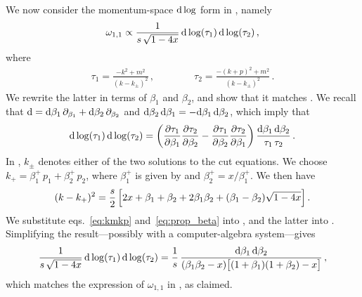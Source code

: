 We now consider the momentum-space $\mathrm{d} \log$ form in , namely
\begin{align} \label{eq:omega11mom}
\omega_{1,1} \propto \frac{1}{s \, \sqrt{1-4x }} \, \mathrm{d} \log(\tau_1) \, \mathrm{d} \log(\tau_2) \,,
\end{align}
where
\begin{align} \label{eq:taus}
\tau_1 = \frac{-k^2+m^2}{(k-k_{\pm})^2} \,, \qquad \qquad \tau_2 = \frac{-(k+p)^2+m^2}{(k-k_{\pm})^2} \,.
\end{align}
We rewrite the latter in terms of $\beta_1$ and $\beta_2$, and show that it matches .
We recall that $\mathrm{d} = \mathrm{d}\beta_1 \, \partial_{\beta_1} + \mathrm{d}\beta_2 \, \partial_{\beta_2}$ and $\mathrm{d} \beta_2 \, \mathrm{d} \beta_1 = - \mathrm{d} \beta_1 \, \mathrm{d} \beta_2$, which imply that
\begin{align} \label{eq:dk2dbeta}
\mathrm{d} \log(\tau_1) \, \mathrm{d} \log(\tau_2) = \left( \frac{\partial \tau_1}{\partial \beta_1} \frac{\partial \tau_2}{\partial \beta_2} - 
   \frac{\partial \tau_1}{\partial \beta_2} \frac{\partial \tau_2}{\partial \beta_1} \right) \frac{\mathrm{d} \beta_1 \, \mathrm{d} \beta_2}{\tau_1 \, \tau_2} \,.
\end{align}
In , $k_{\pm}$ denotes either of the two solutions to the cut equations.
We choose $k_+ = \beta_1^+ \, p_1 + \beta_2^+ \, p_2$, where $\beta_{1}^+$ is given by  and $\beta_2^+=x/\beta_1^+$. We then have
\begin{align} \label{eq:kmkp}
(k-k_+)^2  = \frac{s}{2} \, \Bigl[2x+\beta_1 + \beta_2 + 2 \beta_1 \beta_2 + (\beta_1 - \beta_2) \sqrt{1 - 4 x} \Bigr]\,.
\end{align}
We substitute eqs.~\eqref{eq:kmkp} and~\eqref{eq:prop_beta} into , and the latter into . Simplifying the result---possibly with a computer-algebra system---gives 
\begin{align}
\frac{1}{s \, \sqrt{1-4x }} \, \mathrm{d} \log(\tau_1) \, \mathrm{d} \log(\tau_2) = \frac{1}{s} \, \frac{\mathrm{d}\beta_1 \, \mathrm{d} \beta_2}{(\beta_1 \beta_2 - x) \bigl[(1 + \beta_1)(1 + \beta_2) - x \bigr] } \,,
\end{align}
which matches the expression of $\omega_{1,1}$ in , as claimed.


